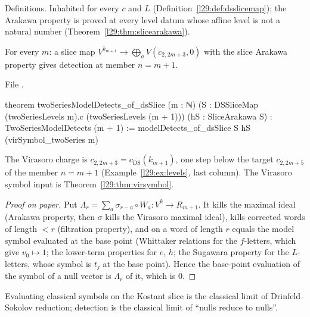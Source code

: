 \begin{status}
Definitions. Inhabited for every $c$ and $L$ (Definition~\ref{l29:def:dsslicemap}); the Arakawa property is proved
at every level datum whose affine level is not a natural number (Theorem~\ref{l29:thm:slicearakawa}).
\end{status}

\begin{theorem}\label{l29:thm:detectreduce}
For every $m$: a slice map $V^{k_{m+1}}\to\bigoplus_aV(c_{2,2m+3},0)$ with the slice Arakawa property gives detection at
member $n=m+1$.
\end{theorem}

\noindent File .
\begin{leancode}
theorem twoSeriesModelDetects_of_dsSlice (m : ℕ)
    (S : DSSliceMap (twoSeriesLevels m).c (twoSeriesLevels (m + 1))) (hS : SliceArakawa S) :
    TwoSeriesModelDetects (m + 1) :=
  modelDetects_of_dsSlice S hS (virSymbol_twoSeries m)
\end{leancode}

\begin{dictionary}
The Virasoro charge is $c_{2,2m+3}=c_{\mathrm{DS}}(k_{m+1})$, one step below the target $c_{2,2m+5}$ of the member
$n=m+1$ (Example~\ref{l29:ex:levels}, last column). The Virasoro symbol input is Theorem~\ref{l29:thm:virsymbol}.
\end{dictionary}

\begin{proof}[Proof on paper]
Put $\Lambda_r=\sum_a\sigma_{r-a}\circ W_a:V^k\to R_{m+1}$. It kills the maximal ideal (Arakawa property, then $\sigma$
kills the Virasoro maximal ideal), kills corrected words of length $<r$ (filtration property), and on a word of length
$r$ equals the model symbol evaluated at the base point (Whittaker relations for the $f$-letters, which give
$v_0\mapsto1$; the lower-term properties for $e$, $h$; the Sugawara property for the $L$-letters, whose symbol is $t_j$
at the base point). Hence the base-point evaluation of the symbol of a null vector is $\Lambda_r$ of it, which is $0$.
\end{proof}

\begin{physics}
Evaluating classical symbols on the Kostant slice is the classical limit of Drinfeld--Sokolov reduction; detection is
the classical limit of ``nulls reduce to nulls''.
\end{physics}


